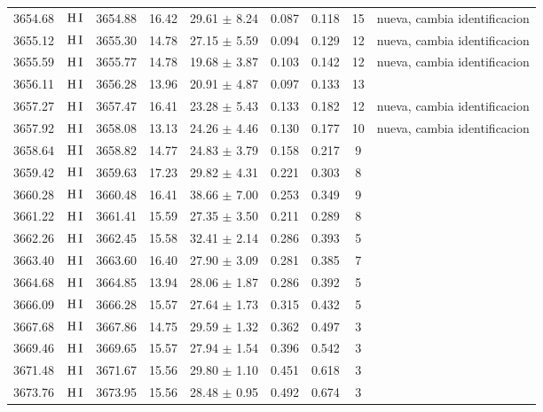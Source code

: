 \documentclass{article}
\begin{document}
\begin{table*}
\begin{adjustbox}{width=\textwidth}
\begin{tabular}{ccccccccc}
3654.68 & $\mbox{H}\thinspace \mbox{I}$ & 3654.88 & 16.42 & 29.61 $\pm$ 8.24 & 0.087 & 0.118 & 15 &  nueva, cambia identificacion \\
3655.12 & $\mbox{H}\thinspace \mbox{I}$ & 3655.30 & 14.78 & 27.15 $\pm$ 5.59 & 0.094 & 0.129 & 12 &  nueva, cambia identificacion \\
3655.59 & $\mbox{H}\thinspace \mbox{I}$ & 3655.77 & 14.78 & 19.68 $\pm$ 3.87 & 0.103 & 0.142 & 12 &  nueva, cambia identificacion \\
3656.11 & $\mbox{H}\thinspace \mbox{I}$ & 3656.28 & 13.96 & 20.91 $\pm$ 4.87 & 0.097 & 0.133 & 13 &  \\
3657.27 & $\mbox{H}\thinspace \mbox{I}$ & 3657.47 & 16.41 & 23.28 $\pm$ 5.43 & 0.133 & 0.182 & 12 &  nueva, cambia identificacion \\
3657.92 & $\mbox{H}\thinspace \mbox{I}$ & 3658.08 & 13.13 & 24.26 $\pm$ 4.46 & 0.130 & 0.177 & 10 &  nueva, cambia identificacion \\
3658.64 & $\mbox{H}\thinspace \mbox{I}$ & 3658.82 & 14.77 & 24.83 $\pm$ 3.79 & 0.158 & 0.217 & 9 &  \\
3659.42 & $\mbox{H}\thinspace \mbox{I}$ & 3659.63 & 17.23 & 29.82 $\pm$ 4.31 & 0.221 & 0.303 & 8 &  \\
3660.28 & $\mbox{H}\thinspace \mbox{I}$ & 3660.48 & 16.41 & 38.66 $\pm$ 7.00 & 0.253 & 0.349 & 9 &  \\
3661.22 & $\mbox{H}\thinspace \mbox{I}$ & 3661.41 & 15.59 & 27.35 $\pm$ 3.50 & 0.211 & 0.289 & 8 &  \\
3662.26 & $\mbox{H}\thinspace \mbox{I}$ & 3662.45 & 15.58 & 32.41 $\pm$ 2.14 & 0.286 & 0.393 & 5 &  \\
3663.40 & $\mbox{H}\thinspace \mbox{I}$ & 3663.60 & 16.40 & 27.90 $\pm$ 3.09 & 0.281 & 0.385 & 7 &  \\
3664.68 & $\mbox{H}\thinspace \mbox{I}$ & 3664.85 & 13.94 & 28.06 $\pm$ 1.87 & 0.286 & 0.392 & 5 &  \\
3666.09 & $\mbox{H}\thinspace \mbox{I}$ & 3666.28 & 15.57 & 27.64 $\pm$ 1.73 & 0.315 & 0.432 & 5 &  \\
3667.68 & $\mbox{H}\thinspace \mbox{I}$ & 3667.86 & 14.75 & 29.59 $\pm$ 1.32 & 0.362 & 0.497 & 3 &  \\
3669.46 & $\mbox{H}\thinspace \mbox{I}$ & 3669.65 & 15.57 & 27.94 $\pm$ 1.54 & 0.396 & 0.542 & 3 &  \\
3671.48 & $\mbox{H}\thinspace \mbox{I}$ & 3671.67 & 15.56 & 29.80 $\pm$ 1.10 & 0.451 & 0.618 & 3 &  \\
3673.76 & $\mbox{H}\thinspace \mbox{I}$ & 3673.95 & 15.56 & 28.48 $\pm$ 0.95 & 0.492 & 0.674 & 3 &  \\

\end{tabular}
\end{adjustbox}
\end{table*}
\end{document}
